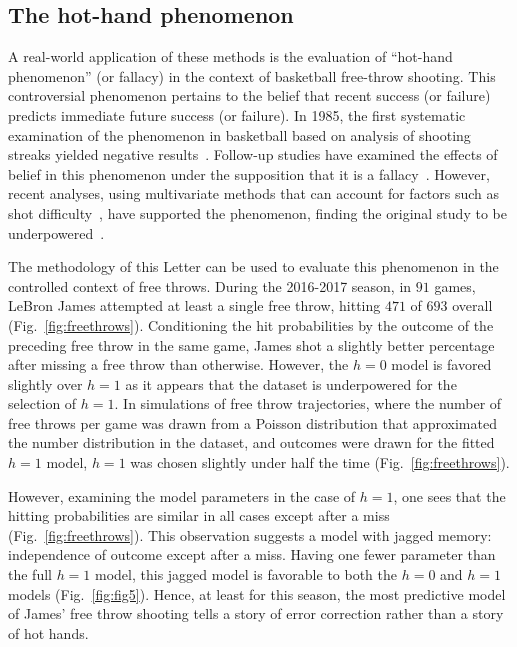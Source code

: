 \documentclass{IOS-Book-Article}
\begin{document}
\subsection{The hot-hand phenomenon} 

A  real-world application of these methods is the evaluation of ``hot-hand phenomenon'' (or fallacy) in the context of basketball free-throw shooting. This controversial phenomenon pertains to the belief that recent success (or failure) predicts immediate future success (or failure).  In 1985, the first systematic examination of the phenomenon in basketball based on analysis of shooting streaks yielded negative results~\cite{gilovich1985hot}. Follow-up studies have examined the effects of belief in this phenomenon under the supposition that it is a fallacy~\cite{burns2001hot}. However, recent analyses, using multivariate methods that can account for factors such as shot difficulty~\cite{bocskocsky2014hot,miller2016surprised}, have supported the phenomenon, finding the original study to be underpowered~\cite{arkes2010revisiting,miller2016surprised}.

The methodology of this Letter can be used to evaluate this phenomenon in the controlled context of free throws.
  During the 2016-2017 season, in $91$ games, LeBron James attempted at least a single free throw, hitting $471$ of $693$ overall (Fig.~\ref{fig:freethrows}).  Conditioning the hit probabilities by the outcome of the preceding free throw in the same game, James shot a slightly better percentage after missing a free throw than otherwise. However, the $h=0$ model is favored slightly over $h=1$ as it appears that the dataset is underpowered for the selection of $h=1$. In simulations of free throw trajectories, where the number of free throws per game was drawn from a Poisson distribution that approximated the number distribution in the dataset, and outcomes were drawn for the fitted $h=1$ model, $h=1$ was chosen slightly under half the time (Fig.~\ref{fig:freethrows}).
  
  However, examining the model parameters in the case of $h=1$, one sees that the hitting probabilities are similar in all cases except after a miss (Fig.~\ref{fig:freethrows}). This observation suggests  a  model with jagged memory: independence of outcome except after a miss. Having one fewer parameter than the full $h=1$ model, this jagged model is favorable to both the $h=0$ and $h=1$ models (Fig.~\ref{fig:fig5}). Hence, at least for this season, the most predictive model of  James' free throw shooting tells a story of error correction rather than a story of hot hands.
  
\end{document}
